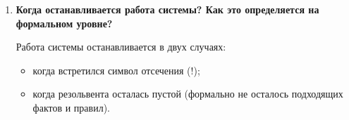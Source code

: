 \begin{enumerate}
\item \textbf{Когда останавливается работа системы? Как это определяется на формальном уровне?}

Работа системы останавливается в двух случаях:

\begin{itemize}
	\item когда встретился символ отсечения (!);
	\item когда резольвента осталась пустой (формально не осталось подходящих фактов и правил).
\end{itemize}
\end{enumerate}

